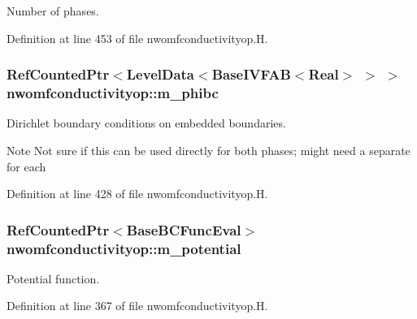 Number of phases. 



Definition at line 453 of file nwomfconductivityop.\+H.

\subsubsection[{\texorpdfstring{m\+\_\+phibc}{m_phibc}}]{\setlength{\rightskip}{0pt plus 5cm}Ref\+Counted\+Ptr$<$Level\+Data$<$Base\+I\+V\+F\+AB$<$Real$>$ $>$ $>$ nwomfconductivityop\+::m\+\_\+phibc\hspace{0.3cm}{\ttfamily [protected]}}\hypertarget{classnwomfconductivityop_a48cc4f2bd26e375295184057f3a2bbba}{}\label{classnwomfconductivityop_a48cc4f2bd26e375295184057f3a2bbba}


Dirichlet boundary conditions on embedded boundaries. 

\begin{DoxyNote}{Note}
Not sure if this can be used directly for both phases; might need a separate for each 
\end{DoxyNote}


Definition at line 428 of file nwomfconductivityop.\+H.

\subsubsection[{\texorpdfstring{m\+\_\+potential}{m_potential}}]{\setlength{\rightskip}{0pt plus 5cm}Ref\+Counted\+Ptr$<$Base\+B\+C\+Func\+Eval$>$ nwomfconductivityop\+::m\+\_\+potential\hspace{0.3cm}{\ttfamily [protected]}}\hypertarget{classnwomfconductivityop_a9e47bf000bacf30039a4ac16c57f4462}{}\label{classnwomfconductivityop_a9e47bf000bacf30039a4ac16c57f4462}


Potential function. 



Definition at line 367 of file nwomfconductivityop.\+H.

